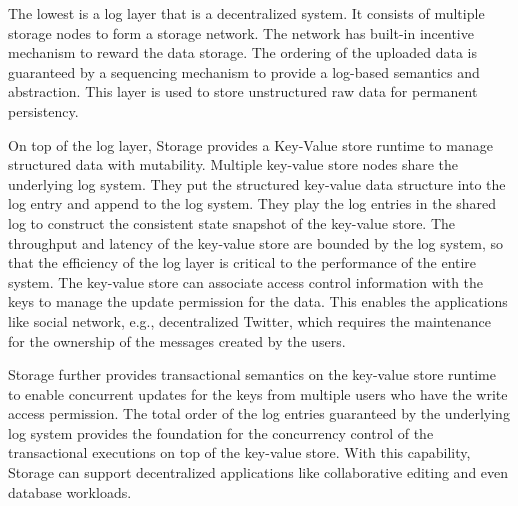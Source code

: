 The lowest is a log layer that is a decentralized system. It consists of multiple storage nodes to form a storage network. The network has built-in incentive mechanism to reward the data storage. The ordering of the uploaded data is guaranteed by a sequencing mechanism to provide a log-based semantics and abstraction. This layer is used to store unstructured raw data for permanent persistency.

On top of the log layer, \projabbrev Storage provides a Key-Value store runtime to manage structured data with mutability. Multiple key-value store nodes share the underlying log system. They put the structured key-value data structure into the log entry and append to the log system. They play the log entries in the shared log to construct the consistent state snapshot of the key-value store. The throughput and latency of the key-value store are bounded by the log system, so that the efficiency of the log layer is critical to the performance of the entire system. The key-value store can associate access control information with the keys to manage the update permission for the data. This enables the applications like social network, e.g., decentralized Twitter, which requires the maintenance for the ownership of the messages created by the users. 

\projabbrev Storage further provides transactional semantics on the key-value store runtime to enable concurrent updates for the keys from multiple users who have the write access permission. The total order of the log entries guaranteed by the underlying log system provides the foundation for the concurrency control of the transactional executions on top of the key-value store. With this capability, \projabbrev Storage can support decentralized applications like collaborative editing and even database workloads.    
